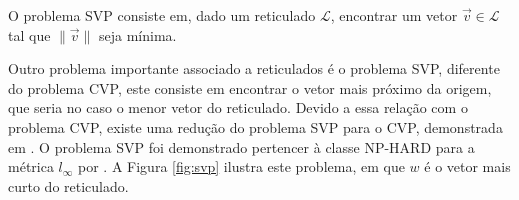     \begin{definition}
         O problema \ac{SVP} consiste em, dado um reticulado $\mathcal{L}$, encontrar um vetor $\vec{v} \in \mathcal{L}$ tal que $\lVert \vec{v} \rVert$ seja mínima.
    \end{definition}

    Outro problema importante associado a reticulados é o problema \ac{SVP}, diferente do problema \ac{CVP}, este consiste em encontrar o vetor mais próximo da origem, que seria no caso o menor vetor do reticulado. Devido a essa relação com o problema \ac{CVP}, existe uma redução do problema \ac{SVP} para o \ac{CVP}, demonstrada em \cite{svp_to_cvp}. O problema \ac{SVP} foi demonstrado pertencer à classe \ac{NP-HARD} para a métrica $l_{\infty}$ por \cite{np-hard-cvp-svp}. A Figura \ref{fig:svp} ilustra este problema, em que $w$ é o vetor mais curto do reticulado.

